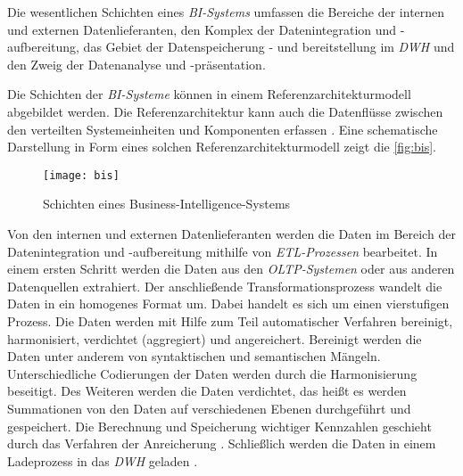 Die wesentlichen Schichten eines \textit{\acrshort{BI}-Systems} umfassen die Bereiche der internen und externen Datenlieferanten, den Komplex der Datenintegration und -aufbereitung, 
das Gebiet der Datenspeicherung - und bereitstellung im \textit{\acrlong{DWH}} und den Zweig der Datenanalyse und -präsentation\cites[vgl.][126 ff.]{linden_geschaftsmodellbasierte_2016}[vgl.][8]{kemper_business_2010}. 

Die Schichten der \textit{\acrshort{BI}-Systeme} können in einem Referenzarchitekturmodell abgebildet werden. 
Die Referenzarchitektur kann auch die Datenflüsse zwischen den verteilten Systemeinheiten und Komponenten erfassen \cite[vgl.][126 ff.]{linden_geschaftsmodellbasierte_2016}.
Eine schematische Darstellung in Form eines solchen Referenzarchitekturmodell zeigt die \autoref{fig:bis}.

\begin{figure}[h]
    \centering
        \texttt{[image: bis]}
        \caption{Schichten eines Business-Intelligence-Systems}
        \label{fig:bis}
\end{figure}

Von den internen und externen Datenlieferanten werden die Daten im Bereich der Datenintegration und -aufbereitung mithilfe von \textit{\acrshort{ETL}-Prozessen} bearbeitet. 
In einem ersten Schritt werden die Daten aus den \textit{\acrshort{OLTP}-Systemen} oder aus anderen Datenquellen extrahiert. 
Der anschließende Transformationsprozess wandelt die Daten in ein homogenes Format um. Dabei handelt es sich um einen vierstufigen Prozess. Die Daten werden mit Hilfe 
zum Teil automatischer Verfahren bereinigt, harmonisiert, verdichtet (aggregiert) und angereichert.
Bereinigt werden die Daten unter anderem von syntaktischen und semantischen Mängeln. Unterschiedliche Codierungen der Daten werden durch die Harmonisierung 
beseitigt. Des Weiteren werden die Daten verdichtet, das heißt es werden Summationen von den Daten auf verschiedenen Ebenen durchgeführt und gespeichert. 
Die Berechnung und Speicherung wichtiger Kennzahlen geschieht durch das Verfahren der Anreicherung \cites[vgl.][86]{gronwald_integrierte_2020}[vgl.][277 f.]{abts_grundkurs_2017}.
Schließlich werden die Daten in einem Ladeprozess in das \textit{\acrlong{DWH}} geladen \cite[vgl.][129 ff.]{linden_geschaftsmodellbasierte_2016}. 


